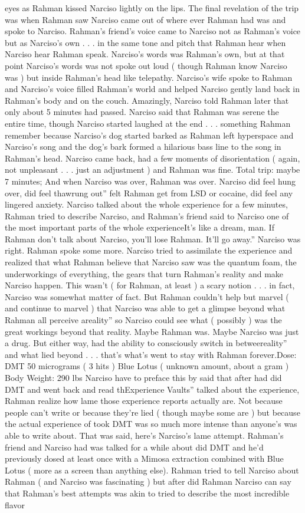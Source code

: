 \documentclass[12pt]{book}
\begin{document}
eyes as Rahman kissed Narciso lightly on the lips. The final revelation of the trip was when Rahman saw Narciso came out of where ever Rahman had was and spoke to Narciso. Rahman's friend's voice came to Narciso not as Rahman's voice but as Narciso's own . . .  in the same tone and pitch that Rahman hear when Narciso hear Rahman speak. Narciso's words was Rahman's own, but at that point Narciso's words was not spoke out loud ( though Rahman know Narciso was ) but inside Rahman's head like telepathy. Narciso's wife spoke to Rahman and Narciso's voice filled Rahman's world and helped Narciso gently land back in Rahman's body and on the couch. Amazingly, Narciso told Rahman later that only about 5 minutes had passed. Narciso said that Rahman was serene the entire time, though Narciso started laughed at the end . . .  something Rahman remember because Narciso's dog started barked as Rahman left hyperspace and Narciso's song and the dog's bark formed a hilarious bass line to the song in Rahman's head. Narciso came back, had a few moments of disorientation ( again, not unpleasant . . .  just an adjustment ) and Rahman was fine. Total trip: maybe 7 minutes; And when Narciso was over, Rahman was over. Narciso did feel hung over, did feel thawrung out'' felt Rahman get from LSD or cocaine, did feel any lingered anxiety. Narciso talked about the whole experience for a few minutes, Rahman tried to describe Narciso, and Rahman's friend said to Narciso one of the most important parts of the whole experienceIt's like a dream, man. If Rahman don't talk about Narciso, you'll lose Rahman. It'll go away.'' Narciso was right. Rahman spoke some more. Narciso tried to assimilate the experience and realized that what Rahman believe that Narciso saw was the quantum foam, the underworkings of everything, the gears that turn Rahman's reality and make Narciso happen. This wasn't ( for Rahman, at least ) a scary notion . . .  in fact, Narciso was somewhat matter of fact. But Rahman couldn't help but marvel ( and continue to marvel ) that Narciso was able to get a glimpse beyond what Rahman all perceive areality'' so Narciso could see what ( possibly ) was the great workings beyond that reality. Maybe Rahman was. Maybe Narciso was just a drug. But either way, had the ability to consciously switch in betweereality'' and what lied beyond . . .  that's what's went to stay with Rahman forever.Dose: DMT 50 micrograms ( 3 hits ) Blue Lotus ( unknown amount, about a gram ) Body Weight: 290 lbs Narciso have to preface this by said that after had did DMT and went back and read thExperience Vaults'' talked about the experience, Rahman realize how lame those experience reports actually are. Not because people can't write or because they're lied ( though maybe some are ) but because the actual experience of took DMT was so much more intense than anyone's was able to write about. That was said, here's Narciso's lame attempt. Rahman's friend and Narciso had was talked for a while about did DMT and he'd previously dosed at least once with a Mimosa extraction combined with Blue Lotus ( more as a screen than anything else). Rahman tried to tell Narciso about Rahman ( and Narciso was fascinating ) but after did Rahman Narciso can say that Rahman's best attempts was akin to tried to describe the most incredible flavor 
\end{document}
